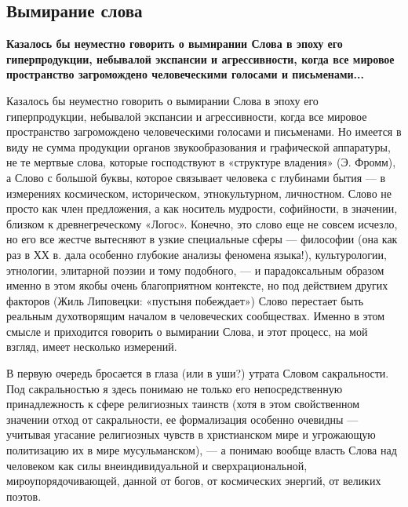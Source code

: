  
 
 

\subsection{Вымирание слова}


\textbf{Казалось бы неуместно говорить о вымирании Слова в эпоху его гиперпродукции,
небывалой экспансии и агрессивности, когда все мировое пространство
загромождено человеческими голосами и письменами...}

Казалось бы неуместно говорить о вымирании Слова в эпоху его гиперпродукции,
небывалой экспансии и агрессивности, когда все мировое пространство
загромождено человеческими голосами и письменами. Но имеется в виду не сумма
продукции органов звукообразования и графической аппаратуры, не те мертвые
слова, которые господствуют в «структуре владения» (Э. Фромм), а Слово с
большой буквы, которое связывает человека с глубинами бытия — в измерениях
космическом, историческом, этнокультурном, личностном. Слово не просто как член
предложения, а как носитель мудрости, софийности, в значении, близком к
древнегреческому «Логос». Конечно, это слово еще не совсем исчезло, но его все
жестче вытесняют в узкие специальные сферы — философии (она как раз в ХХ в.
дала особенно глубокие анализы феномена языка!), культурологии, этнологии,
элитарной поэзии и тому подобного, — и парадоксальным образом именно в этом
якобы очень благоприятном контексте, но под действием других факторов (Жиль
Липовецки: «пустыня побеждает») Слово перестает быть реальным духотворящим
началом в человеческих сообществах. Именно в этом смысле и приходится говорить
о вымирании Слова, и этот процесс, на мой взгляд, имеет несколько измерений.

В первую очередь бросается в глаза (или в уши?) утрата Словом сакральности. Под
сакральностью я здесь понимаю не только его непосредственную принадлежность к
сфере религиозных таинств (хотя в этом свойственном значении отход от
сакральности, ее формализация особенно очевидны — учитывая угасание религиозных
чувств в христианском мире и угрожающую политизацию их в мире мусульманском), —
а понимаю вообще власть Слова над человеком как силы внеиндивидуальной и
сверхрациональной, мироупорядочивающей, данной от богов, от космических
энергий, от великих поэтов.

